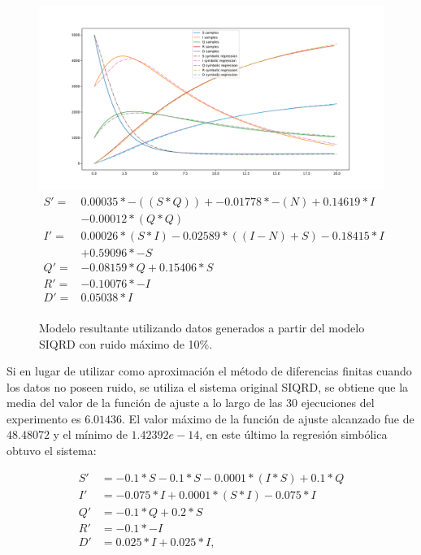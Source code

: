\begin{figure}[h]
    \centering
    \includegraphics[width=\textwidth]{"figures/final_plot_SIQRD_0.1.pdf"}
    \begin{align*}
        S' = & 0.00035 * -((S * Q)) + -0.01778 * -(N) + 0.14619 * I    \\
             & -0.00012 * (Q * Q)                                      \\
        I' = & 0.00026 * (S * I) -0.02589 * ((I - N) + S) -0.18415 * I \\
             & + 0.59096 * -S                                          \\
        Q' = & -0.08159 * Q + 0.15406 * S                              \\
        R' = & -0.10076 * -I                                           \\
        D' = & 0.05038 * I                                             \\
    \end{align*}
    \caption{Modelo resultante utilizando datos generados a partir del modelo SIQRD con ruido máximo de 10\%.}
    \label{fig:final_plot_SIQRD_0.1}
\end{figure}

Si en lugar de utilizar como aproximación el método de diferencias finitas cuando los datos no poseen ruido, se utiliza el sistema original SIQRD, se obtiene que la media del valor de la función de ajuste a lo largo de las 30 ejecuciones del experimento es $6.01436$. El valor máximo de la función de ajuste alcanzado fue de $48.48072$ y el mínimo de $1.42392e-14$, en este último la regresión simbólica obtuvo el sistema:

\begin{align*}
    S' & = -0.1 * S -0.1 * S -0.0001 * (I * S) + 0.1 * Q \\
    I' & = -0.075 * I + 0.0001 * (S * I) -0.075 * I      \\
    Q' & = -0.1 * Q + 0.2 * S                            \\
    R' & = -0.1 * -I                                     \\
    D' & = 0.025 * I + 0.025 * I,
\end{align*}

